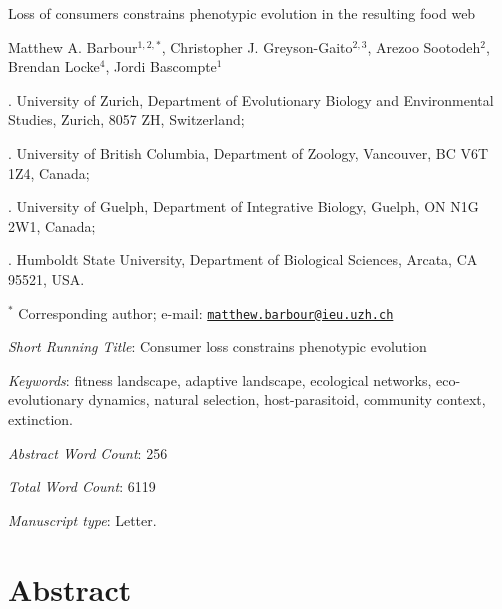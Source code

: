 \documentclass[11pt,]{article}
\author{}
\date{\vspace{-2.5em}}
\begin{document}
\vspace*{0.1cm}

\begin{center} \LARGE Loss of consumers constrains phenotypic evolution in the resulting food web \end{center}

\bigskip

\begin{center} \large Matthew A. Barbour$^{1,2,\ast}$, Christopher J. Greyson-Gaito$^{2,3}$, Arezoo Sootodeh$^{2}$, Brendan Locke$^{4}$, Jordi Bascompte$^{1}$ \normalsize \end{center}

\bigskip

. University of Zurich, Department of Evolutionary Biology
and Environmental Studies, Zurich, 8057 ZH, Switzerland;

. University of British Columbia, Department of Zoology,
Vancouver, BC V6T 1Z4, Canada;

. University of Guelph, Department of Integrative Biology,
Guelph, ON N1G 2W1, Canada;

. Humboldt State University, Department of Biological
Sciences, Arcata, CA 95521, USA.

\(^\ast\) Corresponding author; e-mail:
\href{mailto:matthew.barbour@ieu.uzh.ch}{\nolinkurl{matthew.barbour@ieu.uzh.ch}}

\bigskip

\emph{Short Running Title}: Consumer loss constrains phenotypic
evolution

\bigskip

\emph{Keywords}: fitness landscape, adaptive landscape, ecological
networks, eco-evolutionary dynamics, natural selection, host-parasitoid,
community context, extinction.

\bigskip

\emph{Abstract Word Count}: 256

\bigskip

\emph{Total Word Count}: 6119

\bigskip

\emph{Manuscript type}: Letter.

\bigskip

\linenumbers{} \modulolinenumbers[3]

\newpage

\section{Abstract}\label{abstract}
\end{document}
